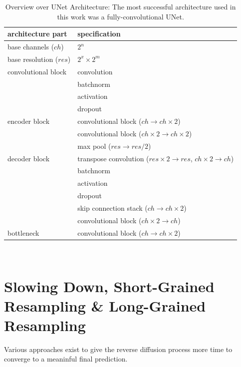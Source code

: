\begin{table}
    \centering
    \caption[Overview over UNet Architecture]{Overview over UNet Architecture: The most successful architecture used in this work was a fully-convolutional UNet.}
    \label{tab:unetlayers}
    \begin{tabular}{l l}
        architecture part              & specification                                                                     \\
        \hline\hline
        base channels ($ch$)           & $2^n$                                                                             \\
        \hline base resolution ($res$) & $2^x \times 2^m$                                                                  \\ \hline
        convolutional block            & convolution                                                                       \\ & batchnorm\\ & activation\\ & dropout                         \\
        \hline encoder block           & convolutional block ($ch \rightarrow ch\times 2$)                                 \\ & convolutional block ($ch\times 2 \rightarrow ch\times 2$) \\ & max pool ($res\rightarrow res/ 2$) \\
        \hline decoder block           & transpose convolution ($res\times 2\rightarrow res$, $ch\times 2 \rightarrow ch$) \\ & batchnorm\\ & activation\\ & dropout \\ & skip connection stack ($ch \rightarrow ch\times 2$) \\ & convolutional block ($ch\times 2 \rightarrow ch$)\\
        \hline bottleneck              & convolutional block ($ch \rightarrow ch\times 2$)
    \end{tabular}
\end{table}

\begin{figure}
    \centering
    \
\end{figure}

\section{Slowing Down, Short-Grained Resampling \& Long-Grained Resampling}
Various approaches exist to give the reverse diffusion process more time to converge to a meaninful final prediction.

